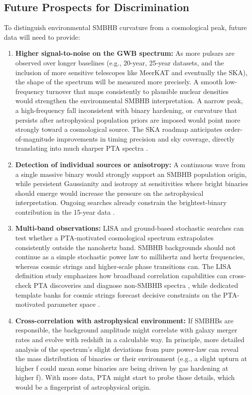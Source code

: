 \documentclass[symmetry,article,submit,pdftex,moreauthors]{Definitions/mdpi}
\begin{document}
\subsection{Future Prospects for Discrimination}
To distinguish environmental SMBHB curvature from a cosmological peak, future data will need to provide:
\begin{enumerate}
    \item \textbf{Higher signal-to-noise on the GWB spectrum:} As more pulsars are observed over longer baselines (e.g., 20-year, 25-year datasets, and the inclusion of more sensitive telescopes like MeerKAT and eventually the SKA), the shape of the spectrum will be measured more precisely. A smooth low-frequency turnover that maps consistently to plausible nuclear densities would strengthen the environmental SMBHB interpretation. A narrow peak, a high-frequency fall inconsistent with binary hardening, or curvature that persists after astrophysical population priors are imposed would point more strongly toward a cosmological source. The SKA roadmap anticipates order-of-magnitude improvements in timing precision and sky coverage, directly translating into much sharper PTA spectra \cite{Janssen2015}.
    \item \textbf{Detection of individual sources or anisotropy:} A continuous wave from a single massive binary would strongly support an SMBHB population origin, while persistent Gaussianity and isotropy at sensitivities where bright binaries should emerge would increase the pressure on the astrophysical interpretation. Ongoing searches already constrain the brightest-binary contribution in the 15-year data \cite{NANOGrav15-NewPhys}.
    \item \textbf{Multi-band observations:} LISA and ground-based stochastic searches can test whether a PTA-motivated cosmological spectrum extrapolates consistently outside the nanohertz band. SMBHB backgrounds should not continue as a simple stochastic power law to millihertz and hertz frequencies, whereas cosmic strings and higher-scale phase transitions can. The LISA definition study emphasizes how broadband correlation capabilities can cross-check PTA discoveries and diagnose non-SMBHB spectra \cite{Colpi2024}, while dedicated template banks for cosmic strings forecast decisive constraints on the PTA-motivated parameter space \cite{BlancoPillado2025LISAStrings}.
    \item \textbf{Cross-correlation with astrophysical environment:} If SMBHBs are responsible, the background amplitude might correlate with galaxy merger rates and evolve with redshift in a calculable way. In principle, more detailed analysis of the spectrum’s slight deviations from pure power-law can reveal the mass distribution of binaries or their environment (e.g., a slight upturn at higher f could mean some binaries are being driven by gas hardening at higher f). With more data, PTA might start to probe those details, which would be a fingerprint of astrophysical origin.
\end{enumerate}
\end{document}
